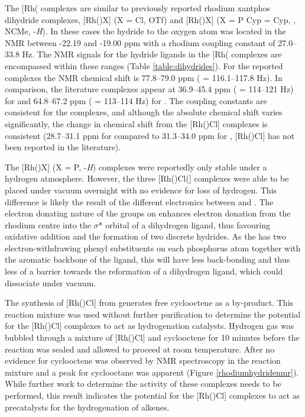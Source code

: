 The [Rh(\tBuxantphosk\ce{)Cl(H)2]} complexes are similar to previously reported rhodium xantphos dihydride complexes,  [Rh(\iPrxantphos)X] (X = Cl, OTf)\cite{Esteruelas2013} and [Rh(\Phxantphos)X] (X = P \acrshort{Cyp} = \acrlong{Cyp}, , NCMe, -\dento{}\emph{H})\cite{Dallanegra2012, Johnson2013, Pawley2010}.   In these cases the hydride \trans{} to the oxygen atom was located in the \proton{} NMR between -22.19 and -19.00 ppm with a rhodium coupling constant of 27.0--33.8 Hz.  The \proton{} NMR signals for the hydride ligands in the [Rh(\tBuxantphosk\ce{)Cl(H)2]} complexes are encompassed within these ranges (Table \ref{table:dihydrides}).  For the reported \tBuxantphos{} complexes the \phosphorus{} NMR chemical shift is 77.8--79.0 ppm (\JRhP{} = 116.1--117.8 Hz).  In comparison, the literature complexes appear at 36.9--45.4 ppm (\JRhP{} = 114--121 Hz) for \Phxantphos{} and 64.8--67.2 ppm (\JRhP{} = 113--114 Hz) for \iPrxantphos{}.  The coupling constants are consistent for the complexes, and although the absolute chemical shift varies significantly, the change in chemical shift from the [Rh(\tBuxantphos)Cl] complexes is consistent (28.7--31.1 ppm for \iPrxantphos{} compared to 31.3--34.0 ppm for \tBuxantphos{}, [Rh(\Phxantphos)Cl] has not been reported in the literature).  

The [Rh(\Phxantphos)X] (X = P, -\dento{}\emph{H}) complexes were reportedly only stable under a hydrogen atmosphere.\cite{Johnson2013, Dallanegra2012}  However, the three [Rh(\tBuxantphos)Cl(] complexes were able to be placed under vacuum overnight with no evidence for loss of hydrogen.  This difference is likely the result of the different electronics between \tBuxantphos{} and \Phxantphos{}.  The electron donating nature of the \tBu{} groups on \tBuxantphos{} enhances electron donation from the rhodium centre into the $\sigma$* orbital of a dihydrogen ligand, thus favouring oxidative addition and the formation of two discrete hydrides.  As the \Phxantphos{} has two electron-withdrawing phenyl substituents on each phosphorus atom together with the aromatic backbone of the ligand, this will have less back-bonding and thus less of a barrier towards the reformation of a dihydrogen ligand, which could dissociate under vacuum.

The synthesis of [Rh(\tBuxantphosk)Cl] from  generates free cyclooctene as a by-product.  This reaction mixture was used without further purification to determine the potential for the [Rh(\tBuxantphosk)Cl] complexes to act as hydrogenation catalysts.  Hydrogen gas was bubbled through a mixture of [Rh(\tBuxantphosk)Cl] and cyclooctene for 10 minutes before the reaction was sealed and allowed to proceed at room temperature.  After  no evidence for cyclooctene was observed by \proton{} NMR spectroscopy in the reaction mixture and a peak for cyclooctane was apparent (Figure \ref{rhodiumhydridenmr}).  While further work to determine the activity of these complexes needs to be performed, this result indicates the potential for the [Rh(\tBuxantphosk)Cl] complexes to act as precatalysts for the hydrogenation of alkenes.  

